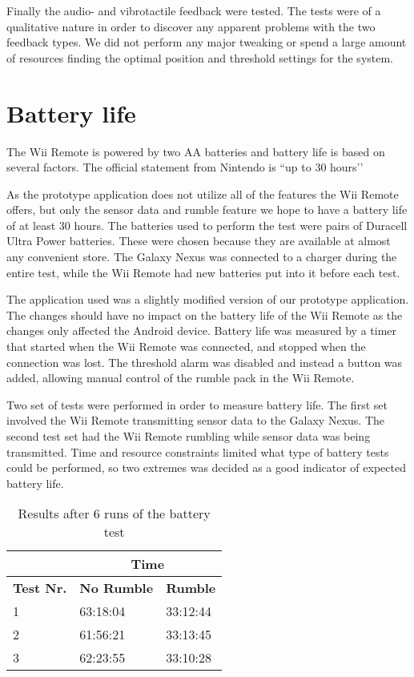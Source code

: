 Finally the audio- and vibrotactile feedback were tested. The tests were of a qualitative nature in order to discover any apparent problems with the two feedback types.  We did not perform any major tweaking or spend a large amount of resources finding the optimal position and threshold settings for the system.

\section{Battery life}
The Wii Remote is powered by two AA batteries and battery life is based on several factors. The official statement from Nintendo is ``up to 30 hours’’ \cite{wiiBattery}

As the prototype application does not utilize all of the features the Wii Remote offers, but only the sensor data and rumble feature we hope to have a battery life of at least 30 hours. The batteries used to perform the test were pairs of Duracell Ultra Power batteries. These were chosen because they are available at almost any convenient store. The Galaxy Nexus was connected to a charger during the entire test, while the Wii Remote had new batteries put into it before each test.

The application used was a slightly modified version of our prototype application. The changes should have no impact on the battery life of the Wii Remote as the changes only affected the Android device. Battery life was measured by a timer that started when the Wii Remote was connected,  and stopped when the connection was lost. The threshold alarm was disabled and instead a button was added, allowing manual control of the rumble pack in the Wii Remote.

Two set of tests were performed in order to measure battery life. The first set involved the Wii Remote transmitting sensor data to the Galaxy Nexus. The second test set had the Wii Remote rumbling while sensor data was being transmitted. Time and resource constraints limited what type of battery tests could be performed, so two extremes was decided as a good indicator of expected battery life. 

\begin{table}[h]
\centering
\setlength{\extrarowheight}{0,2cm}
\begin{tabular}{p{2cm}|p{4.75cm}|p{4.75cm}|}
\cline{2-3}
&\multicolumn{2}{c|}{\textbf{Time}}\\ \hline
\textbf{Test Nr.} &\textbf{No Rumble} & \textbf{Rumble} \\ \hline
1 & 63:18:04 & 33:12:44 \\ \hline
2 & 61:56:21 & 33:13:45 \\ \hline
3 & 62:23:55 & 33:10:28 \\ \hline
\end{tabular}
\caption{Results after 6 runs of the battery test}
\label{tab:batteryLife}
\end{table}

